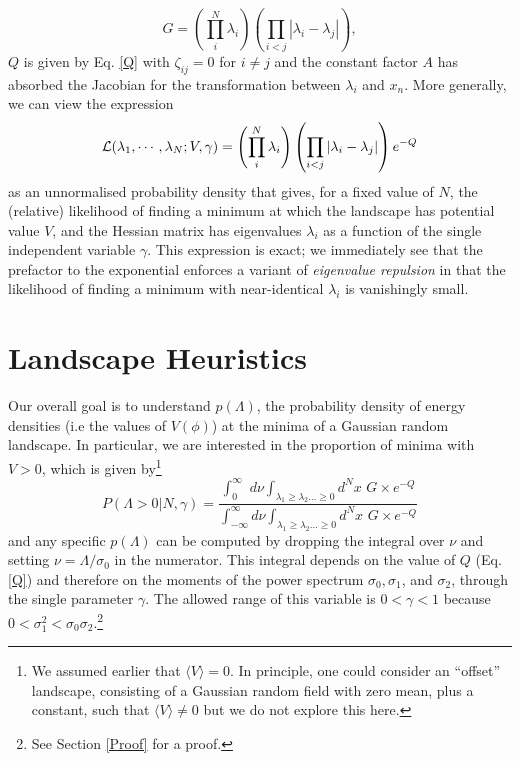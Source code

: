 \documentclass[12pt]{article}
\begin{document}
\begin{equation}
G = \left(\prod_{i}^{N} \lambda_i \right)\left(\prod_{i<j} |\lambda_i-\lambda_j|\right),
\end{equation} 
%
$Q$ is given by Eq. \ref{Q} with $\zeta_{ij}=0$ for $i\neq j$ and the constant factor $A$ has absorbed the Jacobian for the transformation between $\lambda_i$ and $x_n$. More generally, we can view the expression
%
\begin{equation}
{\cal L}(\lambda_1,\cdots, \lambda_N; V, \gamma) = \left(\prod_{i}^{N} \lambda_i \right)\left(\prod_{i<j} |\lambda_i-\lambda_j|\right) e^{-Q}
\end{equation} 
%
as an unnormalised probability density that gives, for a fixed value of $N$, the (relative) likelihood of finding a minimum at which the landscape has potential value $V$, and the Hessian matrix has eigenvalues $\lambda_i$ as a function of the single independent variable $\gamma$. This expression is exact;  we immediately see that the prefactor to the exponential enforces a variant of {\em eigenvalue repulsion\/} \cite{Mehta1990}  in that the likelihood of finding a minimum with near-identical $\lambda_i$ is vanishingly small. 



\section{Landscape Heuristics}

Our  overall goal is to understand $p(\Lambda)$, the probability density of energy densities (i.e the values of $V(\phi)$) at the minima of a Gaussian random landscape. In particular, we are interested in the proportion of  minima with $V > 0$, which is given by\footnote{We assumed earlier that $\langle V \rangle = 0$. In principle, one could consider an ``offset'' landscape, consisting of a Gaussian random field with zero mean, plus a constant, such that $\langle V \rangle \neq 0$ but we do not explore this here.}
\begin{equation} \label{PminIntegral}
  P(\Lambda >0| N,\gamma) =  \frac{\int^\infty_0 \,\,d\nu \int_{\lambda_1 \geq \lambda_2 \ldots \geq 0} d^Nx \,\, G \times e^{-Q} }{\int^\infty_{-\infty} d\nu \int_{\lambda_1 \geq \lambda_2 \ldots \geq 0} d^Nx\,\,G \times e^{-Q}}
  \end{equation}
 and any specific $p(\Lambda)$ can be computed by dropping the integral over $\nu$ and setting $\nu=\Lambda/\sigma_0$ in the numerator.  
%
This integral depends on the value of $Q$ (Eq. \ref{Q}) and therefore on the moments of the power spectrum $\sigma_0, \sigma_1$,  and $\sigma_2$, through the single parameter $\gamma$. The allowed range of this variable is $0<\gamma<1$ because $0<\sigma_1^2<\sigma_0\sigma_2$.\footnote{See Section \ref{Proof} for a proof.}
\end{document}
